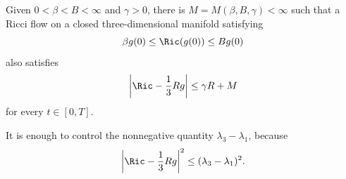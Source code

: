 \begin{theorem}
\label{topping-ch9-roundness-estimate}

Given \(0<\beta<B<\infty\) and \(\gamma>0\), there is
\(M=M(\beta,B,\gamma)<\infty\) such that a Ricci flow on a closed
three-dimensional manifold satisfying
\[
\beta g(0)\le\Ric(g(0))\le Bg(0)
\]
also satisfies
\[
\left|\Ric-\frac13 Rg\right|\le\gamma R+M
\]
for every \(t\in[0,T]\).
\end{theorem}

\begin{remark}
\label{topping-ch9-roundness-reduction}
It is enough to control the nonnegative quantity \(\lambda_3-\lambda_1\),
because
\[
\left|\Ric-\frac13Rg\right|^2\le(\lambda_3-\lambda_1)^2.
\]
\end{remark}
